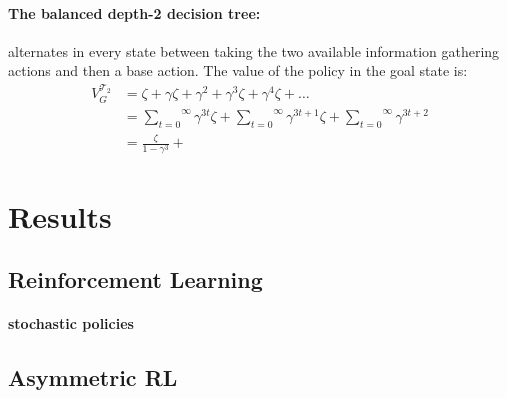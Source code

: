 \paragraph{The balanced depth-2 decision tree:}alternates in every state between taking the two available information gathering actions and then a base action.
The value of the policy in the goal state is:
\begin{align*}
    V^{\mathcal{T_2}}_{G} &= \zeta + \gamma\zeta + \gamma^2 + \gamma^3\zeta + \gamma^4\zeta + \dots \\
    &= \overset{\infty}{\underset{t=0}\sum} \gamma^{3t}\zeta + \overset{\infty}{\underset{t=0}\sum} \gamma^{3t+1}\zeta + \overset{\infty}{\underset{t=0}\sum} \gamma^{3t+2} \\
    &= \frac{\zeta}{1-\gamma^3} + 
\end{align*}
\section{Results}
\subsection{Reinforcement Learning}
\paragraph{stochastic policies}
\subsection{Asymmetric RL}